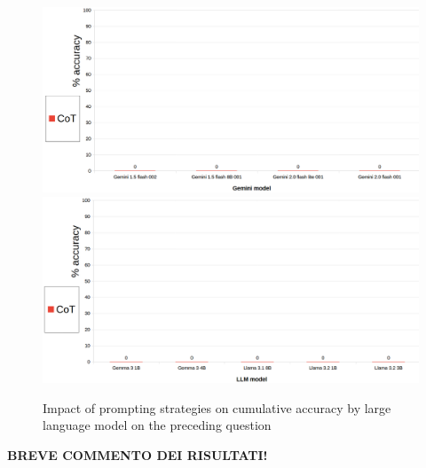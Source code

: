 \documentclass[12pt]{article}
\begin{document}
\begin{figure}[H]
    \centering
            \includegraphics[width=1\textwidth]{q310Gemini.png}
            \includegraphics[width=1\textwidth]{q310Other.png}
    \caption[Accuracy on Question 20 by LLM]{Impact of prompting strategies on cumulative accuracy by large language model on the preceding question}
    \end{figure} 
\textbf{BREVE COMMENTO DEI RISULTATI!}

\vspace{1cm}
\end{document}
